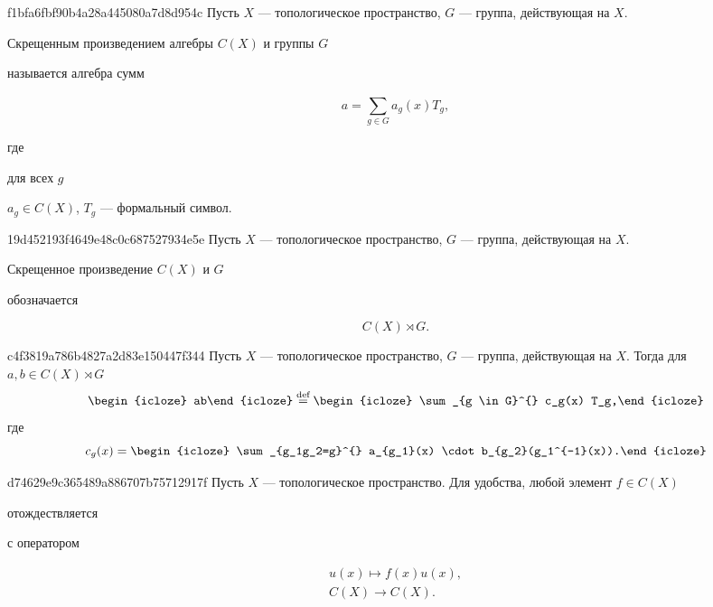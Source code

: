 \begin{note}{f1bfa6fbf90b4a28a445080a7d8d954c}
    Пусть \({ X }\) --- топологическое пространство, \({ G }\) --- группа, действующая на \({ X }\).
    \begin{icloze}{3}Скрещенным произведением алгебры \({ C(X) }\) и группы \({ G }\)\end{icloze} называется алгебра сумм
    \begin{icloze}{1}
        \[
            a = \sum_{g \in G}^{} a_{g}(x) T_{g},
        \]
    \end{icloze}
    где
    \begin{icloze}{2}
        для всех \({ g }\)
        \begin{center}
            \({ a_{g} \in C(X) }\), \quad \({ T_{g} }\) --- формальный символ.
        \end{center}
    \end{icloze}
\end{note}

\begin{note}{19d452193f4649e48c0c687527934e5e}
    Пусть \({ X }\) --- топологическое пространство, \({ G }\) --- группа, действующая на \({ X }\).
    \begin{icloze}{2}Скрещенное произведение \({ C(X) }\) и \({ G }\)\end{icloze} обозначается
    \begin{icloze}{1}
        \[
            C(X) \rtimes G.
        \]
    \end{icloze}
\end{note}

\begin{note}{c4f3819a786b4827a2d83e150447f344}
    Пусть \({ X }\) --- топологическое пространство, \({ G }\) --- группа, действующая на \({ X }\).
    Тогда для \({ a, b \in C(X) \rtimes G }\)
    \[
        \begin{icloze}{3}ab\end{icloze} \overset{\text{def}}= \begin{icloze}{2}\sum_{g \in G}^{} c_g(x) T_g,\end{icloze}
    \]
    где
    \[
        c_g(x) = \begin{icloze}{1}\sum_{g_1g_2=g}^{} a_{g_1}(x) \cdot b_{g_2}(g_1^{-1}(x)).\end{icloze}
    \]
\end{note}

\begin{note}{d74629e9c365489a886707b75712917f}
    Пусть \({ X }\) --- топологическое пространство.
    Для удобства, любой элемент \({ f \in C(X) }\) \begin{icloze}{2}отождествляется\end{icloze} с оператором
    \begin{icloze}{1}
        \[
            \begin{gathered}
                u(x) \mapsto f(x) u(x), \\
                C(X) \to C(X).
            \end{gathered}
        \]
    \end{icloze}
\end{note}

